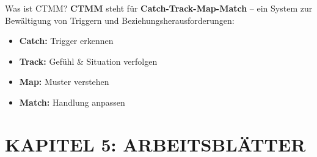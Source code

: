 \begin{ctmmBlueBox}{Was ist CTMM?}
\textbf{CTMM} steht für \textbf{Catch-Track-Map-Match} -- ein System zur Bewältigung von Triggern und Beziehungsherausforderungen:

\begin{itemize}
    \item \textcolor{ctmmBlue}{\textbf{Catch:}} Trigger erkennen
    \item \textcolor{ctmmGreen}{\textbf{Track:}} Gefühl \& Situation verfolgen  
    \item \textcolor{ctmmOrange}{\textbf{Map:}} Muster verstehen
    \item \textcolor{ctmmPurple}{\textbf{Match:}} Handlung anpassen
\end{itemize}
\end{ctmmBlueBox}
















\newpage
\part*{KAPITEL 5: ARBEITSBLÄTTER}












